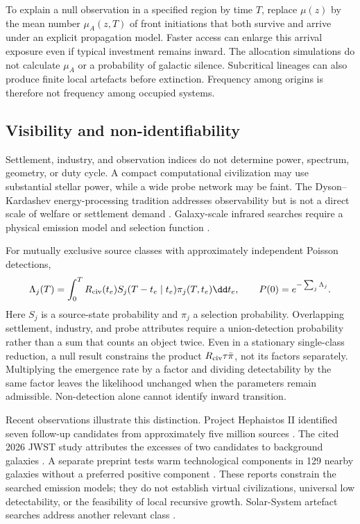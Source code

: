 To explain a null observation in a specified region by time $T$, replace $\mu(z)$ by the mean number $\mu_A(z,T)$ of front initiations that both survive and arrive under an explicit propagation model. Faster access can enlarge this arrival exposure even if typical investment remains inward. The allocation simulations do not calculate $\mu_A$ or a probability of galactic silence. Subcritical lineages can also produce finite local artefacts before extinction. Frequency among origins is therefore not frequency among occupied systems.

\subsection{Visibility and non-identifiability}

Settlement, industry, and observation indices do not determine power, spectrum, geometry, or duty cycle. A compact computational civilization may use substantial stellar power, while a wide probe network may be faint. The Dyson--Kardashev energy-processing tradition addresses observability but is not a direct scale of welfare or settlement demand \citep{Dyson1960,Kardashev1964}. Galaxy-scale infrared searches require a physical emission model and selection function \citep{Wright2014a,Wright2014b}.

For mutually exclusive source classes with approximately independent Poisson detections,
\begin{equation}
 \Lambda_j(T)=\int_0^T R_{\rm civ}(t_e)S_j(T-t_e\mid t_e)\pi_j(T,t_e)\dd t_e,
 \qquad P(0)=e^{-\sum_j\Lambda_j}.
 \label{eq:observations}
\end{equation}
Here $S_j$ is a source-state probability and $\pi_j$ a selection probability. Overlapping settlement, industry, and probe attributes require a union-detection probability rather than a sum that counts an object twice. Even in a stationary single-class reduction, a null result constrains the product $R_{\rm civ}\tau\bar\pi$, not its factors separately. Multiplying the emergence rate by a factor and dividing detectability by the same factor leaves the likelihood unchanged when the parameters remain admissible. Non-detection alone cannot identify inward transition.

Recent observations illustrate this distinction. Project Hephaistos II identified seven follow-up candidates from approximately five million sources \citep{Suazo2024}. The cited 2026 JWST study attributes the excesses of two candidates to background galaxies \citep{Zackrisson2026}. A separate preprint tests warm technological components in 129 nearby galaxies without a preferred positive component \citep{Curtis2026}. These reports constrain the searched emission models; they do not establish virtual civilizations, universal low detectability, or the feasibility of local recursive growth. Solar-System artefact searches address another relevant class \citep{Freitas1983,HaqqMisraKopparapu2012}.

